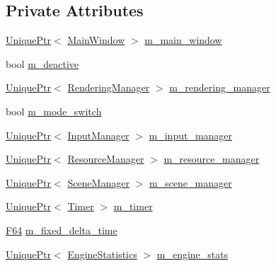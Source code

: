 \subsection*{Private Attributes}
\begin{DoxyCompactItemize}
\item 
\hyperlink{namespacemage_a3316d7143a973e37adf1110f2e80ca31}{Unique\+Ptr}$<$ \hyperlink{classmage_1_1_main_window}{Main\+Window} $>$ \hyperlink{classmage_1_1_engine_a3aea7e8c0c1247cac570334a3d3543d6}{m\+\_\+main\+\_\+window}
\item 
bool \hyperlink{classmage_1_1_engine_ab8a4b0157403708ae7d1d018a95b4c63}{m\+\_\+deactive}
\item 
\hyperlink{namespacemage_a3316d7143a973e37adf1110f2e80ca31}{Unique\+Ptr}$<$ \hyperlink{classmage_1_1_rendering_manager}{Rendering\+Manager} $>$ \hyperlink{classmage_1_1_engine_a81c7475c3501f84f9bd9c7bbeaebfcb6}{m\+\_\+rendering\+\_\+manager}
\item 
bool \hyperlink{classmage_1_1_engine_aa5cb2e0b7bb2c4a9020e79ab832ee221}{m\+\_\+mode\+\_\+switch}
\item 
\hyperlink{namespacemage_a3316d7143a973e37adf1110f2e80ca31}{Unique\+Ptr}$<$ \hyperlink{classmage_1_1_input_manager}{Input\+Manager} $>$ \hyperlink{classmage_1_1_engine_a8e9048208a6a5c5b034aaa1cbdab28bc}{m\+\_\+input\+\_\+manager}
\item 
\hyperlink{namespacemage_a3316d7143a973e37adf1110f2e80ca31}{Unique\+Ptr}$<$ \hyperlink{classmage_1_1_resource_manager}{Resource\+Manager} $>$ \hyperlink{classmage_1_1_engine_ac8d94579e72983a99a78be6b9b606a28}{m\+\_\+resource\+\_\+manager}
\item 
\hyperlink{namespacemage_a3316d7143a973e37adf1110f2e80ca31}{Unique\+Ptr}$<$ \hyperlink{classmage_1_1_scene_manager}{Scene\+Manager} $>$ \hyperlink{classmage_1_1_engine_afac8085ae572d623e77b1e0847440ab4}{m\+\_\+scene\+\_\+manager}
\item 
\hyperlink{namespacemage_a3316d7143a973e37adf1110f2e80ca31}{Unique\+Ptr}$<$ \hyperlink{classmage_1_1_timer}{Timer} $>$ \hyperlink{classmage_1_1_engine_a4daac998928a6c087b310c52b3f26ae4}{m\+\_\+timer}
\item 
\hyperlink{namespacemage_ad26233bbec640deda836e572c1a23708}{F64} \hyperlink{classmage_1_1_engine_a95557e1b6cba52b393c94d80d80bea4c}{m\+\_\+fixed\+\_\+delta\+\_\+time}
\item 
\hyperlink{namespacemage_a3316d7143a973e37adf1110f2e80ca31}{Unique\+Ptr}$<$ \hyperlink{structmage_1_1_engine_statistics}{Engine\+Statistics} $>$ \hyperlink{classmage_1_1_engine_aa0c82f248a2fbec3fbf778665a440edc}{m\+\_\+engine\+\_\+stats}
\end{DoxyCompactItemize}
